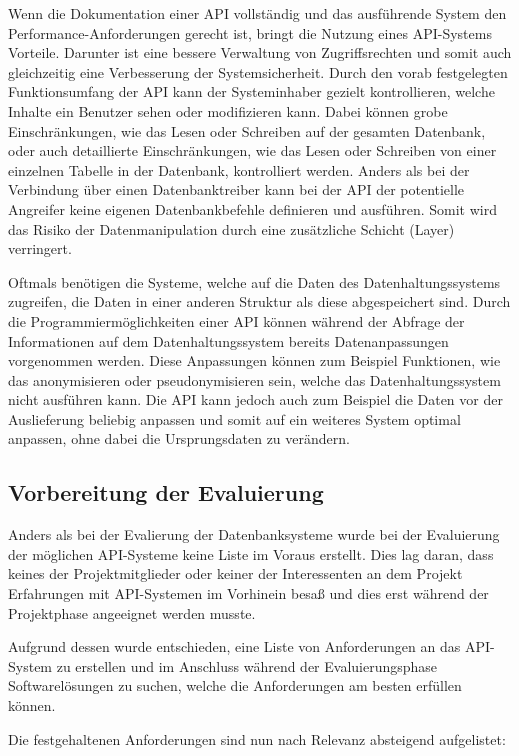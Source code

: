 Wenn die Dokumentation einer API vollständig und das ausführende System den
Performance-Anforderungen gerecht ist, bringt die Nutzung eines API-Systems
Vorteile. Darunter ist eine bessere Verwaltung von Zugriffsrechten und somit
auch gleichzeitig eine Verbesserung der Systemsicherheit. Durch den vorab
festgelegten Funktionsumfang der API kann der Systeminhaber gezielt
kontrollieren, welche Inhalte ein Benutzer sehen oder modifizieren kann. Dabei
können grobe Einschränkungen, wie das Lesen oder Schreiben auf der gesamten
Datenbank, oder auch detaillierte Einschränkungen, wie das Lesen oder Schreiben
von einer einzelnen Tabelle in der Datenbank, kontrolliert werden. Anders als
bei der Verbindung über einen Datenbanktreiber kann bei der API der potentielle
Angreifer keine eigenen Datenbankbefehle definieren und ausführen. Somit wird
das Risiko der Datenmanipulation durch eine zusätzliche Schicht (Layer)
verringert.

Oftmals benötigen die Systeme, welche auf die Daten des Datenhaltungssystems
zugreifen, die Daten in einer anderen Struktur als diese abgespeichert sind.
Durch die Programmiermöglichkeiten einer API können während der Abfrage der
Informationen auf dem Datenhaltungssystem bereits Datenanpassungen vorgenommen
werden. Diese Anpassungen können zum Beispiel Funktionen, wie das anonymisieren
oder pseudonymisieren sein, welche das Datenhaltungssystem nicht ausführen
kann. Die API kann jedoch auch zum Beispiel die Daten vor der Auslieferung
beliebig anpassen und somit auf ein weiteres System optimal anpassen, ohne
dabei die Ursprungsdaten zu verändern.
\nl%

\subsection{Vorbereitung der Evaluierung}
\label{subsec:api_vorbereitung_der_evaluierung}
Anders als bei der Evalierung der Datenbanksysteme wurde bei der Evaluierung
der möglichen API-Systeme keine Liste im Voraus erstellt. Dies lag daran, dass
keines der Projektmitglieder oder keiner der Interessenten an dem Projekt
Erfahrungen mit API-Systemen im Vorhinein besaß und dies erst während der
Projektphase angeeignet werden musste.

Aufgrund dessen wurde entschieden, eine Liste von Anforderungen an das
API-System zu erstellen und im Anschluss während der Evaluierungsphase
Softwarelösungen zu suchen, welche die Anforderungen am besten erfüllen können.

Die festgehaltenen Anforderungen sind nun nach Relevanz absteigend aufgelistet:

